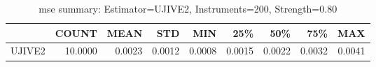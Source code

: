 \begin{table}[ht]
\centering
\caption{mse summary: Estimator=UJIVE2, Instruments=200, Strength=0.80}
\begin{tabular}{lrrrrrrrr}
\toprule
 & COUNT & MEAN & STD & MIN & 25\% & 50\% & 75\% & MAX \\
\midrule
UJIVE2 & 10.0000 & 0.0023 & 0.0012 & 0.0008 & 0.0015 & 0.0022 & 0.0032 & 0.0041 \\
\bottomrule
\end{tabular}
\end{table}
